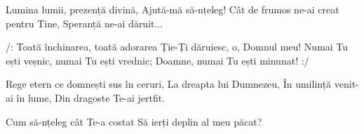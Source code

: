 \beginverse
Lumina lumii, prezență divină,
Ajută-mă să-nțeleg!
Cât de frumos ne-ai creat pentru Tine,
Speranță ne-ai dăruit...
\endverse

\beginchorus
/: Toată închinarea, toată adorarea
Ție-Ți dăruiesc, o, Domnul meu!
Numai Tu ești veșnic, numai Tu ești vrednic;
Doamne, numai Tu ești minunat! :/
\endchorus

\beginverse
Rege etern ce domnești sus în ceruri,
La dreapta lui Dumnezeu,
În umilință venit-ai în lume,
Din dragoste Te-ai jertfit.
\endverse

\beginverse*
Cum să-nțeleg cât Te-a costat
Să ierți deplin al meu păcat?
\endverse
\endsong
